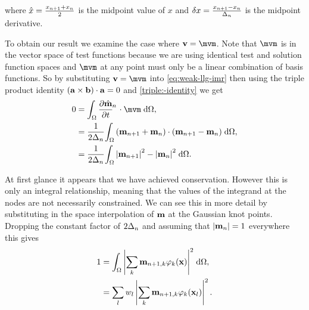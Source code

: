 where $\hat{x} = \frac{x_{n+1} + x_{n}}{2}$ is the midpoint value of $x$ and $\delta x = \frac{x_{n+1} - x_n}{\Delta_{n}}$ is the midpoint derivative.

To obtain our result we examine the case where $\testv = \mvm$.
Note that $\mvm$ is in the vector space of test functions because we are using identical test and solution function spaces and $\mvm$ at any point must only be a linear combination of basis functions.
So by substituting $\testv = \mvm$ into \cref{eq:weak-llg-imr} then using the triple product identity $({\mathbf{a}} \times {\mathbf{b}}) \cdot {\mathbf{a}} = 0$ and \cref{triple:-identity} we get
\begin{equation}
  \label{eq:23}
  \begin{aligned}
    0 &= \ipg{\dmdtm}{\mvm}, \\
    &= \frac{1}{2\dtn} \intd{(\mv_{n+1} + \mv_{n}) \cdot (\mv_{n+1} - \mv_n)}, \\
    &= \frac{1}{2\dtn} \intd{\abs{\mv_{n+1}}^2 - \abs{\mv_{n}}^2}.
  \end{aligned}
\end{equation}

At first glance it appears that we have achieved conservation.
However this is only an integral relationship, meaning that the values of the integrand at the nodes are not necessarily constrained.
We can see this in more detail by substituting in the space interpolation of $\mathbf{m}$ at the Gaussian knot points.
Dropping the constant factor of $2\Delta_{n}$ and assuming that $\left|{\mathbf{m}_n} \right| = 1$ everywhere this gives
\begin{equation}
  \begin{aligned} 
    1 &= {\int_{\Omega} {\left|{\sum_k \mathbf{m}_{n+1, k} \varphi_k(\mathbf{x})} \right|^2} {\; \mathrm{{d}}} {\Omega}}, \\
    &= \sum_l w_l \left|{\sum_k \mathbf{m}_{n+1, k} \varphi_k(\mathbf{x}_l)} \right|^2.
  \end{aligned} 
\end{equation}

